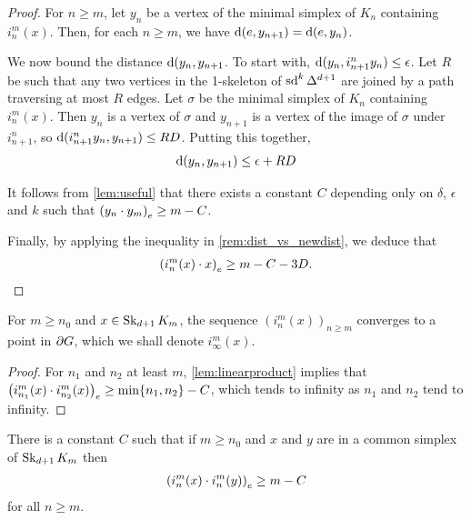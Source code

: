\documentclass[a4paper]{article}
\begin{document}
\begin{proof}
  For $n \geq m$, let $y_n$ be a vertex of the minimal simplex of $K_n$
  containing $i^m_n(x)$. Then, for each $n \geq m$, we have $\dist(e, y_{n+1})
  = \dist(e, y_n)$. 

  We now bound the distance $\dist(y_n, y_{n+1}$. To start with, $\dist(y_n,
  i^n_{n+1} y_n) \leq \epsilon$. Let $R$ be such that any two vertices in the
  1-skeleton of $\sd^k \Delta^{d+1}$ are joined by a path traversing at most
  $R$ edges. Let $\sigma$ be the minimal simplex of $K_n$ containing
  $i^m_n(x)$. Then $y_n$ is a vertex of $\sigma$ and $y_{n+1}$ is a vertex of
  the image of $\sigma$ under $i^n_{n+1}$, so $\dist(i^n_{n+1} y_n, y_{n+1})
  \leq RD$.  Putting this together,
  \begin{align*}
      \dist(y_n, y_{n+1}) \leq \epsilon + RD
  \end{align*}

  It follows from \cref{lem:useful} that there exists a constant $C$ depending
  only on $\delta$, $\epsilon$ and $k$ such that $\gromov{e}{y_n}{y_m} \geq m -
  C$.

  Finally, by applying the inequality in \cref{rem:dist_vs_newdist}, we deduce
  that
  \begin{align*}
      \gromov{e}{i^m_n(x)}{x} \geq m - C - 3D.\qedhere
  \end{align*}
\end{proof}

\begin{corollary}
  For $m \geq n_0$ and $x \in \Skel_{d+1} K_m$, the sequence
  $(i^m_n(x))_{n\geq m}$ converges to a point in $\boundary G$, which we shall
  denote $i^m_\infty(x)$.
\end{corollary}

\begin{proof}
  For $n_1$ and $n_2$ at least $m$, \cref{lem:linearproduct} implies that
  $\gromov{e}{i^m_{n_1}(x)}{i^m_{n_2}(x)} \geq \min\{n_1,n_2\} - C$, which
  tends to infinity as $n_1$ and $n_2$ tend to infinity.
\end{proof}

\begin{lemma}\label{lem:simplexproduct}
  There is a constant $C$ such that if $m \geq n_0$ and $x$ and $y$ are in a
  common simplex of $\Skel_{d+1} K_m$ then
  \begin{align*}
    \gromov{e}{i^m_n(x)}{i^m_n(y)} \geq m - C
  \end{align*}
  for all $n\geq m$.
\end{lemma}
\end{document}
